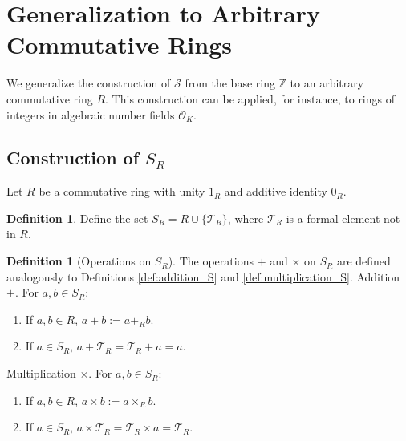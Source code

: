 \documentclass[11pt, a4paper]{article}
\theoremstyle{plain}
\theoremstyle{definition}
\newtheorem{definition}[theorem]{Definition}
\numberwithin{equation}{section}
\newcommand{\Z}{\mathbb{Z}}
\newcommand{\Tobj}{\mathcal{T}} %
\newcommand{\SemiringS}{\mathcal{S}}
\newcommand{\OK}{\mathcal{O}_K}
\newcommand{\SR}{S_{R}}
\begin{document}
\section{Generalization to Arbitrary Commutative Rings}

We generalize the construction of $\SemiringS$ from the base ring $\Z$ to an arbitrary commutative ring $R$. This construction can be applied, for instance, to rings of integers in algebraic number fields $\OK$.

\subsection{Construction of \texorpdfstring{$\SR$}{S\_R}}

Let $R$ be a commutative ring with unity $1_R$ and additive identity $0_R$.

\begin{definition}\label{def:construction_SR}
Define the set $\SR = R \cup \{\Tobj_R\}$, where $\Tobj_R$ is a formal element not in $R$.
\end{definition}

\begin{definition}[Operations on $\SR$]\label{def:operations_SR}
The operations $+$ and $\times$ on $\SR$ are defined analogously to Definitions \ref{def:addition_S} and \ref{def:multiplication_S}.
Addition $+$. For $a, b \in \SR$:
\begin{enumerate}
    \item If $a, b \in R$, $a+b := a+_{R} b$.
    \item If $a \in \SR$, $a+\Tobj_R = \Tobj_R+a = a$.
\end{enumerate}
Multiplication $\times$. For $a, b \in \SR$:
\begin{enumerate}
    \item If $a, b \in R$, $a\times b := a\times_{R} b$.
    \item If $a \in \SR$, $a\times\Tobj_R = \Tobj_R\times a = \Tobj_R$.
\end{enumerate}
\end{definition}
\end{document}

